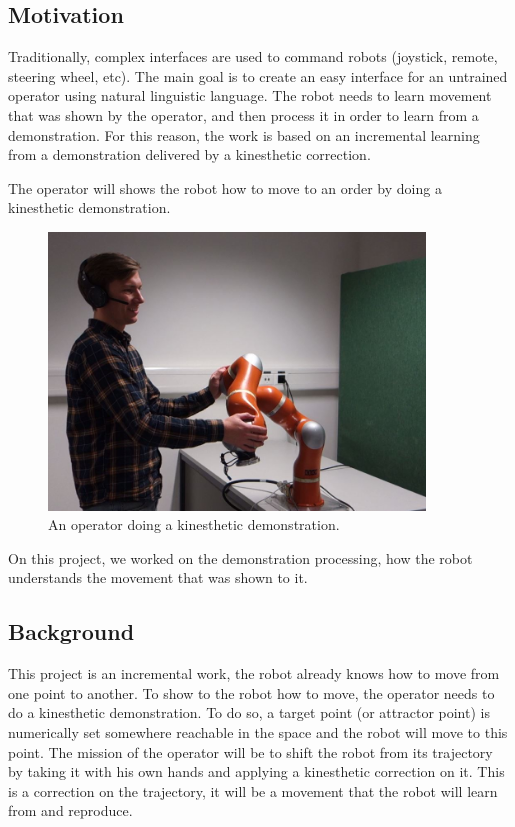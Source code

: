 \subsection{Motivation}

Traditionally, complex interfaces are used to command robots (joystick, remote, steering wheel, etc). The main goal is to create an easy interface for an untrained operator using natural linguistic language. The robot needs to learn movement that was shown by the operator, and then process it in order to learn from a demonstration. For this reason, the work is based on an incremental learning from a demonstration delivered by a kinesthetic correction.

The operator will shows the robot how to move to an order by doing a kinesthetic demonstration.\\

\begin{figure}[H]
\centering
\includegraphics[width=10cm]{img/klas_dem.jpg}
\caption{An operator doing a kinesthetic demonstration.}
\end{figure}

On this project, we worked on the demonstration processing, how the robot understands the movement that was shown to it.

\subsection{Background} 

This project is an incremental work, the robot already knows how to move from one point to another. To show to the robot how to move, the operator needs to do a kinesthetic demonstration. To do so, a target point (or attractor point) is numerically set somewhere reachable in the space and the robot will move to this point. The mission of the operator will be to shift the robot from its trajectory by taking it with his own hands and applying a kinesthetic correction on it. This is a correction on the trajectory, it will be a movement that the robot will learn from and reproduce.\\

